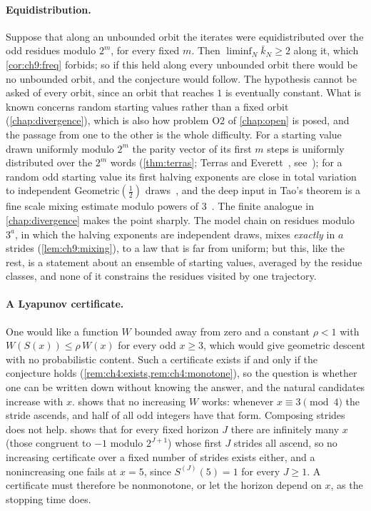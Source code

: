 \paragraph{Equidistribution.} Suppose that along an unbounded orbit the iterates were equidistributed over the odd residues modulo $2^m$, for every fixed $m$.
Then $\liminf_N\bar k_N\ge2$ along it, which \cref{cor:ch9:freq} forbids; so if this held along every unbounded orbit there would be no unbounded orbit, and the conjecture would follow.
The hypothesis cannot be asked of every orbit, since an orbit that reaches $1$ is eventually constant.
What is known concerns random starting values rather than a fixed
orbit (\cref{chap:divergence}), which is also how problem O2 of \cref{chap:open} is posed, and the passage from one to the other is the whole
difficulty. For a starting value drawn uniformly modulo $2^m$ the parity vector of its first $m$ steps is uniformly distributed over the $2^m$ words (\cref{thm:terras}; Terras and Everett~\cite{terras1976,everett1977},
see~\cite[Theorem~B]{lagarias1985}); for a random odd starting value its first halving exponents are close in
total variation to independent Geometric$(\tfrac12)$ draws~\cite[Proposition~1.9]{tao2022},
and the deep input in Tao's theorem is a fine scale mixing estimate modulo
powers of $3$~\cite[Proposition~1.14]{tao2022}. The finite analogue in
\cref{chap:divergence} makes the point sharply. The model chain on residues
modulo $3^a$, in which the halving exponents are independent draws, mixes \emph{exactly} in
$a$ strides (\cref{lem:ch9:mixing}), to a law that is far from uniform; but this,
like the rest, is a statement about an ensemble of starting values, averaged by the residue classes, and
none of it constrains the residues visited by one trajectory.

\paragraph{A Lyapunov certificate.} One would like a function $W$ bounded away
from zero and a
constant $\rho<1$ with $W(S(x))\le\rho\,W(x)$ for every odd $x\ge3$, which would
give geometric descent with no probabilistic content. Such a certificate exists
if and only if the conjecture holds (\cref{rem:ch4:exists,rem:ch4:monotone}), so the
question is whether one can be written down without knowing the answer, and
the natural candidates increase with $x$. 
shows that no increasing $W$ works: whenever $x\equiv3\pmod4$ the stride ascends, and
half of all odd integers have that form. Composing strides does not help.
 shows that for every fixed horizon $J$ there are
infinitely many $x$ (those congruent to $-1$ modulo $2^{J+1}$) whose first $J$
strides all ascend, so no increasing certificate over a fixed number of strides exists
either, and a nonincreasing one fails at $x=5$, since $S^{(J)}(5)=1$ for every $J\ge1$.
A certificate must therefore be nonmonotone, or let the horizon depend
on $x$, as the stopping time does.

